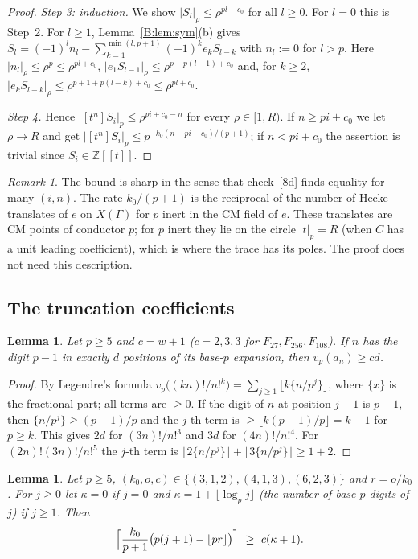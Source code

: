 \documentclass[11pt,a4paper]{article}
\newtheorem{lemma}[theorem]{Lemma}
\theoremstyle{definition}\newtheorem{definition}[theorem]{Definition}
\theoremstyle{remark}\newtheorem{remark}[theorem]{Remark}
\newcommand{\Z}{\mathbb Z}
\numberwithin{equation}{section}
\begin{document}
\begin{proof}
\emph{Step 3: induction.} We show $|S_l|_\rho\le\rho^{pl+c_0}$ for all $l\ge0$. For $l=0$ this is Step~2. For $l\ge1$,
Lemma~\ref{B:lem:sym}(b) gives $S_l=(-1)^ln_l-\sum_{k=1}^{\min(l,p+1)}(-1)^ke_kS_{l-k}$ with $n_l:=0$ for $l>p$. Here
$|n_l|_\rho\le\rho^p\le\rho^{pl+c_0}$, $|e_1S_{l-1}|_\rho\le\rho^{p+p(l-1)+c_0}$ and, for $k\ge2$,
$|e_kS_{l-k}|_\rho\le\rho^{p+1+p(l-k)+c_0}\le\rho^{pl+c_0}$.

\emph{Step 4.} Hence $|[t^n]S_i|_p\le\rho^{pi+c_0-n}$ for every $\rho\in[1,R)$. If $n\ge pi+c_0$ we let $\rho\to R$ and get
$|[t^n]S_i|_p\le p^{-k_0(n-pi-c_0)/(p+1)}$; if $n<pi+c_0$ the assertion is trivial since $S_i\in\Z[[t]]$.
\end{proof}

\begin{remark}
The bound is sharp in the sense that check~[8d] finds equality for many $(i,n)$. The rate $k_0/(p+1)$ is the
reciprocal of the number of Hecke translates of $e$ on $X(\Gamma)$ for $p$ inert in the CM field of $e$. These translates
are CM points of conductor $p$; for $p$ inert they lie on the circle $|t|_p=R$ (when $C$ has a unit leading coefficient),
which is where the trace has its poles. The proof does not need this description.
\end{remark}

\subsection{The truncation coefficients}
\begin{lemma}\label{B:lem:carry}
Let $p\ge5$ and $c=w+1$ ($c=2,3,3$ for $F_{27},F_{256},F_{108}$). If $n$ has the digit $p-1$ in exactly $d$ positions of
its base-$p$ expansion, then $v_p(a_n)\ge cd$.
\end{lemma}

\begin{proof}
By Legendre's formula $v_p\bigl((kn)!/n!^k\bigr)=\sum_{j\ge1}\lfloor k\{n/p^j\}\rfloor$, where $\{x\}$ is the fractional
part; all terms are $\ge0$. If the digit of $n$ at position $j-1$ is $p-1$, then $\{n/p^j\}\ge(p-1)/p$ and the $j$-th term is
$\ge\lfloor k(p-1)/p\rfloor=k-1$ for $p\ge k$. This gives $2d$ for $(3n)!/n!^3$ and $3d$ for $(4n)!/n!^4$. For
$(2n)!(3n)!/n!^5$ the $j$-th term is $\lfloor2\{n/p^j\}\rfloor+\lfloor3\{n/p^j\}\rfloor\ge1+2$.
\end{proof}

\begin{lemma}\label{B:lem:arith}
Let $p\ge5$, $(k_0,o,c)\in\{(3,1,2),(4,1,3),(6,2,3)\}$ and $r=o/k_0$. For $j\ge0$ let $\kappa=0$ if $j=0$ and
$\kappa=1+\lfloor\log_pj\rfloor$ (the number of base-$p$ digits of $j$) if $j\ge1$. Then
\[
\Bigl\lceil\frac{k_0}{p+1}\bigl(p(j+1)-\lfloor pr\rfloor\bigr)\Bigr\rceil\ \ge\ c(\kappa+1).
\]
\end{lemma}
\end{document}
